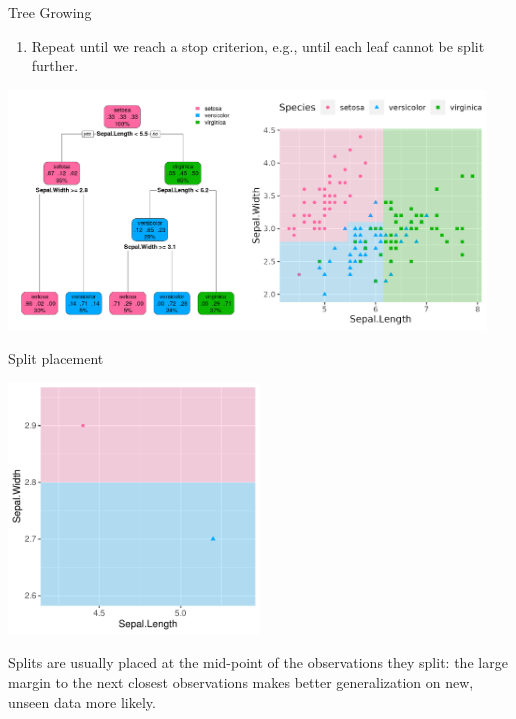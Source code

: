 \documentclass[11pt,compress,t,notes=noshow, xcolor=table]{beamer}
\begin{document}
\begin{vbframe}{Tree Growing}
\begin{enumerate}[4]
\item Repeat until we reach a stop criterion, e.g., until each leaf cannot be split further.
\end{enumerate}

\color{fgcolor}

{\centering \includegraphics[width=0.95\textwidth]{figure/tree-classif-depth3.pdf} 

}

\end{vbframe}



\begin{vbframe}{Split placement}
\begin{knitrout}\scriptsize
{}\color{fgcolor}

{\centering \includegraphics[width=0.5\textwidth]{figure/split_point.pdf}

}



\end{knitrout}
\lz
Splits are usually placed at the mid-point of the observations they split: the large margin to the next closest observations makes better generalization on new, unseen data more likely.
\end{vbframe}
\end{document}

